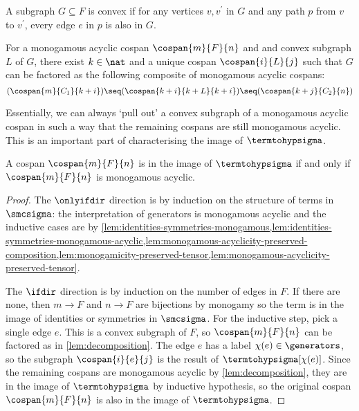 \begin{definition}
    A subgraph \(G \subseteq F\) is convex if for any vertices \(v, v^\prime\) in
    \(G\) and any path \(p\) from \(v\) to \(v^\prime\), every edge \(e\) in
    \(p\) is also in \(G\).
\end{definition}

\begin{lemma}
    \label{lem:decomposition}
    For a monogamous acyclic cospan \(\cospan{m}{F}{n}\) and
    and convex subgraph \(L\) of \(G\), there exist
    \(k \in \nat\) and a unique cospan
    \(\cospan{i}{L}{j}\) such that \(G\) can be factored as
    the following composite of monogamous acyclic cospans:
    \[
        (\cospan{m}{C_1}{k + i})
        \seq
        (\cospan{
            k + i
        }{
            k + L
        }{
            k + i
        })
        \seq
        (\cospan{k + j}{C_2}{n})
    \]
\end{lemma}

Essentially, we can always `pull out' a convex subgraph of a monogamous acyclic
cospan in such a way that the remaining cospans are still monogamous acyclic.
This is an important part of characterising the image of \(\termtohypsigma\).

\begin{theorem}\label{thm:monogamous-acyclic-full}
    A cospan \(\cospan{m}{F}{n}\) is in the image of
    \(\termtohypsigma\) if and only if \(\cospan{m}{F}{n}\)
    is monogamous acyclic.
\end{theorem}
\begin{proof}
    The \(\onlyifdir\) direction is by induction on the structure of terms in
    \(\smcsigma\): the interpretation of generators is monogamous acyclic and
    the inductive cases are by
    \cref{lem:identities-symmetries-monogamous,lem:identities-symmetries-monogamous-acyclic,lem:monogamous-acyclicity-preserved-composition,lem:monogamicity-preserved-tensor,lem:monogamous-acyclicity-preserved-tensor}.

    The \(\ifdir\) direction is by induction on the number of edges in \(F\).
    If there are none, then \(m \to F\) and \(n \to F\) are
    bijections by monogamy so the term is in the image of
    identities or symmetries in \(\smcsigma\).
    For the inductive step, pick a single edge \(e\).
    This is a convex subgraph of \(F\), so
    \(\cospan{m}{F}{n}\) can be factored as in
    \cref{lem:decomposition}.
    The edge \(e\) has a label \(\chi(e) \in \generators\), so the subgraph
    \(\cospan{i}{e}{j}\) is the result of
    \(\termtohypsigma[\chi(e)]\).
    Since the remaining cospans are monogamous acyclic by
    \cref{lem:decomposition}, they are in the image of \(\termtohypsigma\) by
    inductive hypothesis, so the original cospan
    \(\cospan{m}{F}{n}\) is also in the image of
    \(\termtohypsigma\).
\end{proof}

